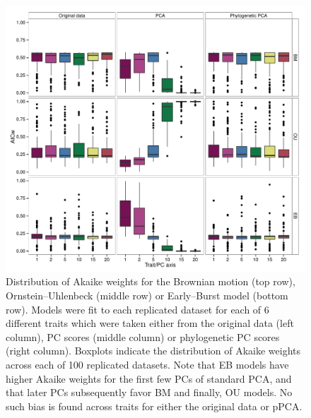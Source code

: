 \documentclass[a4paper,12pt]{article}
\begin{document}
\begin{figure}[p]
\centering
\includegraphics[scale=0.65]{./fig/box-aicw-corbm.pdf}
\caption{Distribution of Akaike weights for the Brownian motion (top row), Ornstein--Uhlenbeck (middle row) or Early--Burst model (bottom row). Models were fit to each replicated dataset for each of 6 different traits which were taken either from the original data (left column), PC scores (middle column) or phylogenetic PC scores (right column). Boxplots indicate the distribution of Akaike weights across each of 100 replicated datasets. Note that EB models have higher Akaike weights for the first few PCs of standard PCA, and that later PCs subsequently favor BM and finally, OU models. No such bias is found across traits for either the original data or pPCA.}
\label{corbm}
\end{figure}
\end{document}
